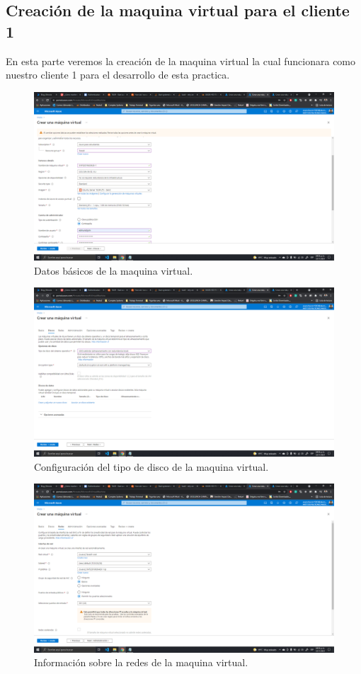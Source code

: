 \documentclass[11pt]{article}
\begin{document}
		\subsection{Creación de la maquina virtual para el cliente 1}
En esta parte veremos la creación de la maquina virtual la cual funcionara como nuestro cliente 1 para el desarrollo de esta practica.
		\begin{figure}[H]
			\centering
			\includegraphics[scale=0.34]{resources/Infobasica1.png}
			\caption{Datos básicos de la maquina virtual.}\label{fig:picture}
		\end{figure}
		\begin{figure}[H]
			\centering
			\includegraphics[scale=0.34]{resources/disco1.png}
			\caption{Configuración del tipo de disco de la maquina virtual.}\label{fig:picture}
		\end{figure}
		\begin{figure}[H]
			\centering
			\includegraphics[scale=0.34]{resources/redes1.png}
			\caption{Información sobre la redes de la maquina virtual.}\label{fig:picture}
		\end{figure}
\end{document}
